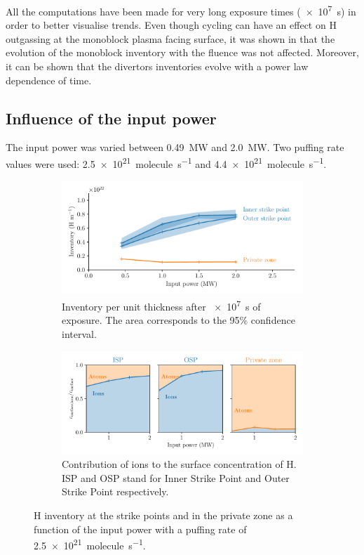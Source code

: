 All the computations have been made for very long exposure times (\SI{e7}{s}) in order to better visualise trends.
Even though cycling can have an effect on H outgassing at the monoblock plasma facing surface, it was shown in \cite{hodille_modelling_2021} that the evolution of the monoblock inventory with the fluence was not affected.
Moreover, it can be shown that the divertors inventories evolve with a power law dependence of time.

\subsection{Influence of the input power}

The input power was varied between \SI{0.49}{MW} and \SI{2.0}{MW}.
Two puffing rate values were used: \SI{2.5e21}{molecule.s^{-1}} and \SI{4.4e21}{molecule.s^{-1}}.

\begin{figure}[h]
    \centering
    \begin{subfigure}{\linewidth}
        \includegraphics[width=\linewidth]{Figures/divertor/WEST/inventory_at_sps_and_private_zone_vs_input_power.pdf}
        \caption{Inventory per unit thickness after \SI{e7}{s} of exposure. The area corresponds to the 95\% confidence interval.}
        \label{fig: local retention vs input power}
    \end{subfigure}
    \begin{subfigure}{\linewidth}                          
        \includegraphics[width=\linewidth]{Figures/divertor/WEST/ions_ratio_vs_input_power.pdf}
        \caption{Contribution of ions to the surface concentration of H. ISP and OSP stand for Inner Strike Point and Outer Strike Point respectively.}
        \label{fig: ion ration vs input power}
    \end{subfigure}%
    \caption{H inventory at the strike points and in the private zone as a function of the input power with a puffing rate of \SI{2.5e21}{molecule.s^{-1}}.}
\end{figure}

